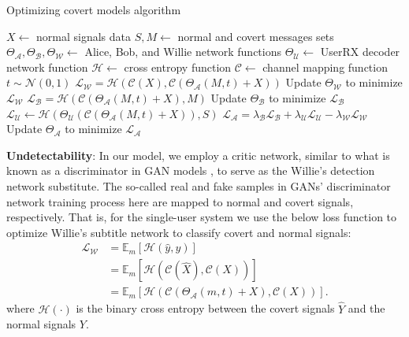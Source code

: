 \begin{algorithm}[tp!]
	\caption{Optimizing covert models algorithm}\label{alg:cap}
	\small
	\begin{algorithmic}
		\State $X \gets$ normal signals data
		\State $S, M \gets$ normal and covert messages sets
		\State $\Theta_{\mathcal{A}}, \Theta_{\mathcal{B}}, \Theta_{\mathcal{W}} \gets$ Alice, Bob, and Willie network functions
		\State $\Theta_{\mathcal{U}} \gets$ UserRX decoder network function
		\State $\mathcal{H} \gets$ cross entropy function
		\State $\mathcal{C} \gets$ channel mapping function
		\State $t \sim \mathcal{N}(0, 1)$
		\State $\mathcal{L}_{\mathcal{W}} = \mathcal{H}(\mathcal{C}(X), \mathcal{C}(\Theta_{\mathcal{A}}(M, t) + X))$
		\State Update $\Theta_{\mathcal{W}}$ to minimize $\mathcal{L}_{\mathcal{W}}$
		\State $\mathcal{L}_{\mathcal{B}} = \mathcal{H}(\mathcal{C}(\Theta_{\mathcal{A}}(M, t) + X), M)$
		\State Update $\Theta_{\mathcal{B}}$ to minimize $\mathcal{L}_{\mathcal{B}}$
		\State $\mathcal{L}_{\mathcal{U}} \gets \mathcal{H}(\Theta_{\mathcal{U}}(\mathcal{C}(\Theta_{\mathcal{A}}(M, t) + X)), S)$
		\State
		$\mathcal{L}_{\mathcal{A}} = \lambda_{\mathcal{B}} \mathcal{L}_{\mathcal{B}} + \lambda_{\mathcal{U}} \mathcal{L}_{\mathcal{U}} - \lambda_{\mathcal{W}} \mathcal{L}_{\mathcal{W}}$
		\State Update $\Theta_{\mathcal{A}}$ to minimize $\mathcal{L}_{\mathcal{A}}$
		\EndFor
	\end{algorithmic}
\end{algorithm}

\textbf{Undetectability}: In our model, we employ a critic network, similar to what is known as a discriminator in GAN models \cite{goodfellow2014generative}, to serve as the Willie's detection network substitute. The so-called real and fake samples in GANs' discriminator network training process here are mapped to normal and covert signals, respectively. That is, for the single-user system we use the below loss function to optimize Willie's subtitle network to classify covert and normal signals:
\begin{equation}
	\begin{aligned} \label{willie_loss}
	\mathcal{L}_{\mathcal{W}} & = \mathbb{E}_{m}[\mathcal{H}(\hat{y}, y)] \\
	& = \mathbb{E}_{m}[\mathcal{H}(\mathcal{C}(\hat{X}), \mathcal{C}(X))] \\
	& = \mathbb{E}_{m}[\mathcal{H}(\mathcal{C}(\Theta_{\mathcal{A}}(m, t) + X), \mathcal{C}(X))].
	\end{aligned}
\end{equation}
where \(\mathcal{H}(\cdot)\) is the binary cross entropy between the covert signals \(\hat{Y}\) and the normal signals \(Y\). 

